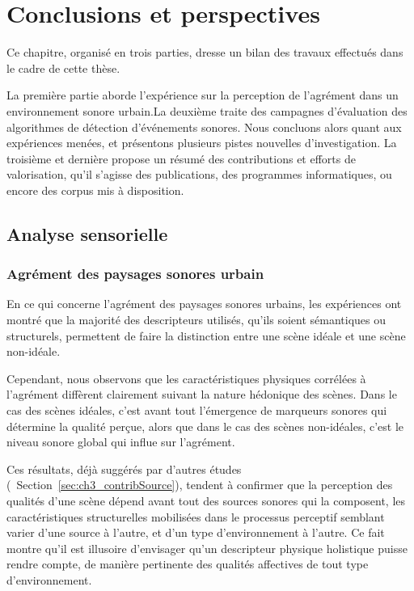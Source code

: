 \chapter{Conclusions et perspectives}\label{ch:end_conc}

Ce chapitre, organisé en trois parties, dresse un bilan des travaux effectués dans le cadre de cette thèse.

La première partie aborde l'expérience sur la perception de l'agrément dans un environnement sonore urbain.La deuxième traite des campagnes d'évaluation des algorithmes de détection d'événements sonores. Nous concluons alors quant aux expériences menées, et présentons plusieurs pistes nouvelles d'investigation. La troisième et dernière propose un résumé des contributions et efforts de valorisation, qu'il s'agisse des publications, des programmes informatiques, ou encore des corpus mis à disposition.

\section{Analyse sensorielle}

\subsection{Agrément des paysages sonores urbain}

En ce qui concerne l'agrément des paysages sonores urbains, les expériences ont montré que la majorité des descripteurs utilisés, qu'ils soient sémantiques ou structurels, permettent de faire la distinction entre une scène idéale et une scène non-idéale.

Cependant, nous observons que les caractéristiques physiques corrélées à l'agrément diffèrent clairement suivant la nature hédonique des scènes. Dans le cas des scènes idéales, c'est avant tout l'émergence de marqueurs sonores qui détermine la qualité perçue, alors que dans le cas des scènes non-idéales, c'est le niveau sonore global qui influe sur l'agrément.

Ces résultats, déjà suggérés par d'autres études (\cf~Section~\ref{sec:ch3_contribSource}), tendent à confirmer que la perception des qualités d'une scène dépend avant tout des sources sonores qui la composent, les caractéristiques structurelles mobilisées dans le processus perceptif semblant varier d'une source à l'autre, et d'un type d'environnement à l'autre. Ce fait montre qu'il est illusoire d'envisager qu'un descripteur physique holistique puisse rendre compte, de manière pertinente des qualités affectives de tout type d'environnement.

